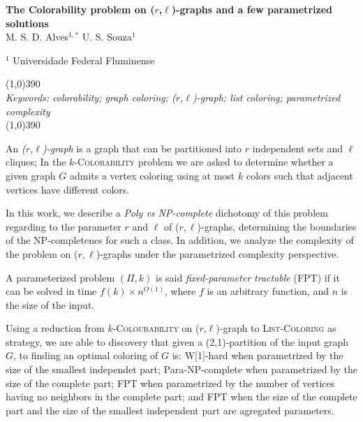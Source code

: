 \documentclass[12pt]{article}
\begin{document}
\pagestyle{empty}

\begin{center}
\Large

{\bf The {Colorability} problem on ($r$,$\ell$)-graphs and a few parametrized solutions }\\[0.2in]

\large
%
%
%
M. S. D. Alves$^{1,*}$\hspace{.2cm}
U. S. Souza$^1$\hspace{.2cm}

%
$^1$ Universidade Federal Fluminense

\end{center}
\normalsize
\vspace{-2.0ex}

%
\noindent\line(1,0){390}\\
%
{\it Keywords: colorability; graph coloring; ($r$,$\ell$)-graph; list coloring; parametrized complexity}\\%
%
\line(1,0){390}\\
\vspace{-2.0ex}
\sloppy

An \emph{($r$,$\ell$)-graph} is a graph that can be partitioned into $r$ independent sets and $\ell$ cliques; In 
the \textsc{$k$-Colorability} problem we are asked to determine whether a given graph $G$ admits a vertex coloring using at most $k$ colors such that adjacent vertices have different colors.

In this work, we describe a \emph{Poly vs NP-complete} dichotomy of this problem regarding to the parameter $r$ and $\ell$ of ($r,\ell$)-graphs, determining the boundaries of the NP-completenes for such a class. In addition, we analyze the complexity of the problem on ($r,\ell$)-graphs under the parametrized complexity perspective. 
 
A parameterized problem $(\Pi,k)$ is said \emph{fixed-parameter tractable} (FPT) if it can be solved in time $f(k)\times n^{O(1)}$, where $f$ is an arbitrary function, and $n$ is the size of the input. 
 
Using a reduction from \textsc{$k$-Colourability} on ($r$,$\ell$)-graph to \textsc{List-Coloring} as strategy, we are able to discovery that given a (2,1)-partition of the input graph $G$, to finding an optimal coloring of $G$ is: W[1]-hard when parametrized by the size of the smallest independet part; Para-NP-complete when parametrized by the size of the complete part; FPT when parametrized by the number of vertices having no neighbors in the complete part; and FPT when the size of the complete part and the size of the smallest independent part are agregated parameters.
 
\end{document}
